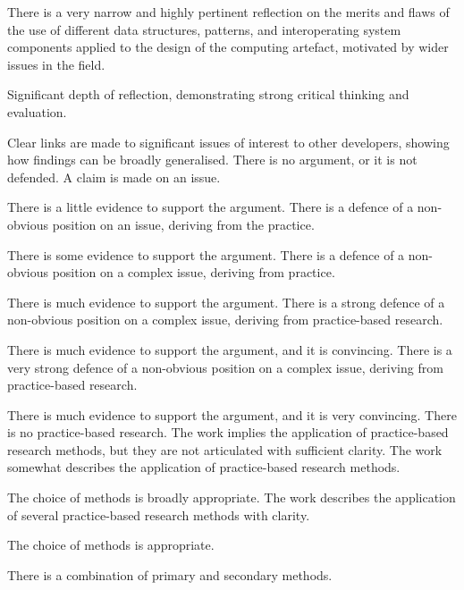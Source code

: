 \documentclass{../../fal_assignment}
\begin{document}
\begin{markingrubric}
	\grade There is a very narrow and highly pertinent reflection on the merits and flaws of the use of different data structures, patterns, and interoperating system components applied to the design of the computing artefact, motivated by wider issues in the field.
	\par Significant depth of reflection, demonstrating strong critical thinking and evaluation.
	\par Clear links are made to significant issues of interest to other developers, showing how findings can be broadly generalised. 
%
        \grade\fail There is no argument, or it is not defended.
        \grade A claim is made on an issue.
            \par There is a little evidence to support the argument.
        \grade There is a defence of a non-obvious position on an issue, deriving from the practice.
            \par There is some evidence to support the argument.
        \grade There is a defence of a non-obvious position on a complex issue, deriving from practice.
            \par There is much evidence to support the argument.
        \grade There is a strong defence of a non-obvious position on a complex issue, deriving from practice-based research.
            \par There is much evidence to support the argument, and it is convincing.
        \grade There is a very strong defence of a non-obvious position on a complex issue, deriving from practice-based research.
            \par There is much evidence to support the argument, and it is very convincing.
%
        \grade\fail There is no practice-based research.
        \grade The work implies the application of practice-based research methods, but they are not articulated with sufficient clarity.
        \grade The work somewhat describes the application of practice-based research methods.
            \par The choice of methods is broadly appropriate.
        \grade The work describes the application of several practice-based research methods with clarity.
            \par The choice of methods is appropriate.
            \par There is a combination of primary and secondary methods.

\end{markingrubric}
\end{document}

